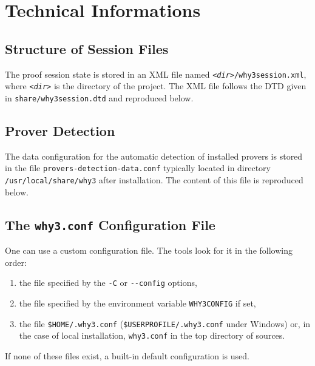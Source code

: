 \chapter{Technical Informations}


\section{Structure of Session Files}

The proof session state is stored in an XML file named
\texttt{\textsl{<dir>}/why3session.xml}, where \texttt{\textsl{<dir>}}
is the directory of the project.
The XML file follows the DTD given in \texttt{share/why3session.dtd} and reproduced below.



\section{Prover Detection}
\label{sec:proverdetecttiondata}

The data configuration for the automatic detection of
installed provers is stored in the file
\texttt{provers-detection-data.conf} typically located in directory
\verb|/usr/local/share/why3| after installation. The content of this
file is reproduced below.
{\footnotesize

}

\section{The \texttt{why3.conf} Configuration File}
\label{sec:whyconffile}

One can use a custom configuration file. The \why
tools look for it in the following order:
\begin{enumerate}
\item the file specified by the \texttt{-C} or \texttt{-{}-config} options,
\item the file specified by the environment variable
  \texttt{WHY3CONFIG} if set,
\item the file \texttt{\$HOME/.why3.conf}
  (\texttt{\$USERPROFILE/.why3.conf} under Windows) or, in the case of
  local installation, \texttt{why3.conf} in the top directory of \why sources.
\end{enumerate}
If none of these files exist, a built-in default configuration is used.


